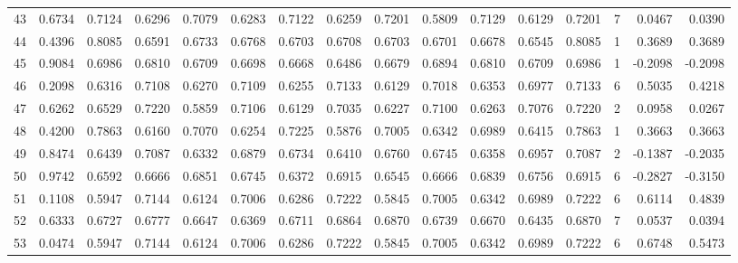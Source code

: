 \begin{tabular}{lrrrrrrrrrrrrrrr}
43  &      0.6734 &  0.7124 &  0.6296 &  0.7079 &  0.6283 &  0.7122 &  0.6259 &  0.7201 &  0.5809 &  0.7129 &   0.6129 &     0.7201 &      7 &                    0.0467 &                     0.0390 \\
44  &      0.4396 &  0.8085 &  0.6591 &  0.6733 &  0.6768 &  0.6703 &  0.6708 &  0.6703 &  0.6701 &  0.6678 &   0.6545 &     0.8085 &      1 &                    0.3689 &                     0.3689 \\
45  &      0.9084 &  0.6986 &  0.6810 &  0.6709 &  0.6698 &  0.6668 &  0.6486 &  0.6679 &  0.6894 &  0.6810 &   0.6709 &     0.6986 &      1 &                   -0.2098 &                    -0.2098 \\
46  &      0.2098 &  0.6316 &  0.7108 &  0.6270 &  0.7109 &  0.6255 &  0.7133 &  0.6129 &  0.7018 &  0.6353 &   0.6977 &     0.7133 &      6 &                    0.5035 &                     0.4218 \\
47  &      0.6262 &  0.6529 &  0.7220 &  0.5859 &  0.7106 &  0.6129 &  0.7035 &  0.6227 &  0.7100 &  0.6263 &   0.7076 &     0.7220 &      2 &                    0.0958 &                     0.0267 \\
48  &      0.4200 &  0.7863 &  0.6160 &  0.7070 &  0.6254 &  0.7225 &  0.5876 &  0.7005 &  0.6342 &  0.6989 &   0.6415 &     0.7863 &      1 &                    0.3663 &                     0.3663 \\
49  &      0.8474 &  0.6439 &  0.7087 &  0.6332 &  0.6879 &  0.6734 &  0.6410 &  0.6760 &  0.6745 &  0.6358 &   0.6957 &     0.7087 &      2 &                   -0.1387 &                    -0.2035 \\
50  &      0.9742 &  0.6592 &  0.6666 &  0.6851 &  0.6745 &  0.6372 &  0.6915 &  0.6545 &  0.6666 &  0.6839 &   0.6756 &     0.6915 &      6 &                   -0.2827 &                    -0.3150 \\
51  &      0.1108 &  0.5947 &  0.7144 &  0.6124 &  0.7006 &  0.6286 &  0.7222 &  0.5845 &  0.7005 &  0.6342 &   0.6989 &     0.7222 &      6 &                    0.6114 &                     0.4839 \\
52  &      0.6333 &  0.6727 &  0.6777 &  0.6647 &  0.6369 &  0.6711 &  0.6864 &  0.6870 &  0.6739 &  0.6670 &   0.6435 &     0.6870 &      7 &                    0.0537 &                     0.0394 \\
53  &      0.0474 &  0.5947 &  0.7144 &  0.6124 &  0.7006 &  0.6286 &  0.7222 &  0.5845 &  0.7005 &  0.6342 &   0.6989 &     0.7222 &      6 &                    0.6748 &                     0.5473 \\

\end{tabular}
